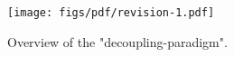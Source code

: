 \begin{figure}
\begin{center}
   \texttt{[image: figs/pdf/revision-1.pdf]}
\end{center}
   \caption{
    Overview of the "decoupling-paradigm".
   }
\label{fig:revision1}
\end{figure}
